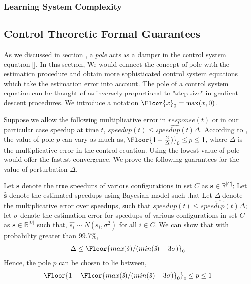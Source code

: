 \subsubsection{Learning System Complexity}

\subsection{Control Theoretic Formal Guarantees}
As we discussed in section \secref{}, a \emph{pole} acts as a damper in the control system equation \eqref{}. In this section, We would connect the concept of pole with the estimation procedure and obtain more sophisticated control system equations which take the estimation error into account.
The pole of a control system equation can be thought of as inversely proportional to "step-size" in gradient descent procedures. %
We introduce a notation $\Floor{x}_0 = \max(x,0)$.

Suppose we allow the following multiplicative error in $response(t)$ or in our particular case speedup at time $t$, $speedup(t) \leq  \hat{speedup(t)} \Delta$. According to \cite{}, the value of pole $p$ can vary as much as, $\Floor{1-\frac{2}{\Delta})}_0\leq p \leq 1$, where $\Delta$ is the multiplicative error in the control equation. Using the lowest value of pole would offer the fastest convergence. We prove the following guarantees for the value of perturbation $\Delta$,

\begin{theorem}
Let $\mathbf{s}$ denote the true speedups of various configurations in set $C$ as $\mathbf{s} \in \mathbb{R}^{|C|}$; Let $\hat{\mathbf{s}}$ denote the estimated speedups using Bayesian model such that
Let $\Delta$ denote the multiplicative error over speedups, such that $speedup(t) \leq \hat{speedup(t)}\Delta $; let $\sigma$ denote the estimation error for speedups of various configurations in set $C$ as $\mathbf{s} \in \mathbb{R}^{|C|}$ such that, $\hat{s_i} \sim N(s_i, \sigma^2)$ for all $i \in C$. We can show that with probability greater than 99.7\%,
$$
\Delta \leq \Floor{max(\hat{s})/(min(\hat{s}) -  3\sigma)}_0
$$
Hence, the pole $p$ can be chosen to lie between, $$\Floor{1- \Floor{max(\hat{s})/(min(\hat{s}) -  3\sigma)}_0}_0 \leq p \leq 1$$
\end{theorem}

